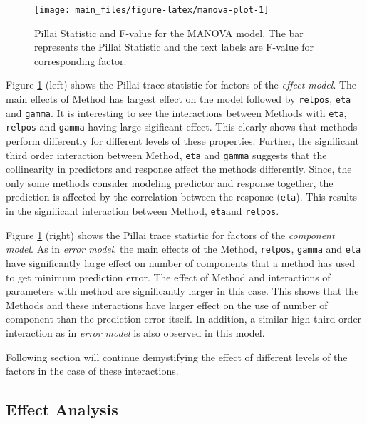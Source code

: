 \documentclass[12pt,3p,authoryear]{elsarticle}
\providecommand{\tightlist}{%
  \setlength{\itemsep}{0pt}\setlength{\parskip}{0pt}}
\begin{document}
\begin{figure}
\texttt{[image: main\_files/figure-latex/manova-plot-1]} \caption{Pillai Statistic and F-value for the MANOVA model. The
bar represents the Pillai Statistic and the text labels are F-value for
corresponding factor.}\label{fig:manova-plot}
\end{figure}

\begin{description}
\tightlist
\item[\emph{Error Model}:]
Figure \ref{fig:manova-plot} (left) shows the Pillai trace statistic for
factors of the \emph{effect model}. The main effects of Method has
largest effect on the model followed by \texttt{relpos}, \texttt{eta}
and \texttt{gamma}. It is interesting to see the interactions between
Methods with \texttt{eta}, \texttt{relpos} and \texttt{gamma} having
large sigificant effect. This clearly shows that methods perform
differently for different levels of these properties. Further, the
significant third order interaction between Method, \texttt{eta} and
\texttt{gamma} suggests that the collinearity in predictors and response
affect the methods differently. Since, the only some methods consider
modeling predictor and response together, the prediction is affected by
the correlation between the response (\texttt{eta}). This results in the
significant interaction between Method, \texttt{eta}and \texttt{relpos}.
\item[\emph{Component Model}:]
Figure \ref{fig:manova-plot} (right) shows the Pillai trace statistic
for factors of the \emph{component model}. As in \emph{error model}, the
main effects of the Method, \texttt{relpos}, \texttt{gamma} and
\texttt{eta} have significantly large effect on number of components
that a method has used to get minimum prediction error. The effect of
Method and interactions of parameters with method are significantly
larger in this case. This shows that the Methods and these interactions
have larger effect on the use of number of component than the prediction
error itself. In addition, a similar high third order interaction as in
\emph{error model} is also observed in this model.
\end{description}

Following section will continue demystifying the effect of different
levels of the factors in the case of these interactions.

\hypertarget{effect-analysis}{%
\subsection{Effect Analysis}\label{effect-analysis}}
\end{document}
